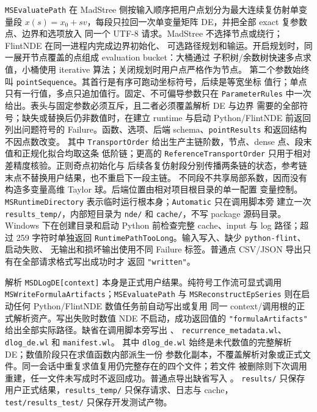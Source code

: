 \documentclass[11pt,a4paper]{ctexart}
\begin{document}
\texttt{MSEvaluatePath} 在 MadStree 侧按输入顺序把用户点划分为最大连续复仿射单变量段
$x(s)=x_0+s v$，每段只拉回一次单变量矩阵 DE，并把全部 exact 复参数点、边界和选项放入
同一个 UTF-8 请求。MadStree 不选择节点或绕行；FlintNDE 在同一进程内完成边界初始化、
可选路径规划和输运。开启规划时，同一展开节点覆盖的点组成 evaluation bucket：大桶通过
子积树/余数树快速多点求值，小桶使用 iterative 算法；关闭规划时用户点严格作为节点。
第二个参数始终叫 \texttt{pointSequence}。其首行是有序可跑动坐标符号，后续是等宽坐标
值行；单点只有一行值，多点只追加值行。固定、不可偏导参数只在
\texttt{ParameterRules} 中一次给出。表头与固定参数必须互斥，且二者必须覆盖解析 DE 与边界
需要的全部符号；缺失或替换后仍非数值时，在建立 runtime 与启动 Python/FlintNDE 前返回
列出问题符号的 Failure。函数、选项、后端 schema、\texttt{pointResults} 和返回结构不因点数改变。
其中 \texttt{TransportOrder} 给出生产主链阶数，节点、dense 点、段末值和正规化拟合均取这条
低阶链；更高的 \texttt{ReferenceTransportOrder} 只用于相对差精度核验。正则奇点初始化与
后续各复仿射段分别传播两条链的状态，参考链末点不替换用户结果，也不重启下一段主链。
不同段不共享局部系数，因而没有构造多变量高维 Taylor 球。后端位置由相对项目根目录的单一配置
变量控制。\texttt{MSRuntimeDirectory} 表示临时运行根本身；\texttt{Automatic} 只在调用脚本旁
建立一次 \texttt{results\_temp/}，内部短目录为 \texttt{nde/} 和 \texttt{cache/}，不写 package
源码目录。Windows 下在创建目录和启动 Python 前检查完整 cache、input 与 log 路径；超过 259
字符时单独返回 \texttt{RuntimePathTooLong}。输入写入、缺少 \texttt{python-flint}、启动失败、
无输出和损坏输出使用不同 Failure 标签。普通点 CSV/JSON 导出只有在全部请求格式写出成功时才
返回 \texttt{"written"}。

解析 \texttt{MSDLogDE[context]} 本身是正式用户结果。纯符号工作流可显式调用
\texttt{MSWriteFormula\allowbreak Artifacts}；\texttt{MSEvaluatePath} 与
\texttt{MSReconstructEp\allowbreak Series} 则在启动任何 Python/FlintNDE 数值任务前自动写出或复用
同一 context/调用根的正式解析资产。写出失败时数值 NDE 不启动，成功返回值的
\texttt{"formula\allowbreak Artifacts"} 给出全部实际路径。缺省在调用脚本旁写出
、
\texttt{recurrence\_metadata.wl}、\texttt{dlog\_de.wl} 和 \texttt{manifest.wl}。
其中 \texttt{dlog\_de.wl} 始终是未代数值的完整解析 DE；数值阶段只在求值函数内部派生一份
参数化副本，不覆盖解析对象或正式文件。同一会话中重复求值复用仍完整存在的四个文件；若文件
被删除则下次调用重建，任一文件未写成时不返回成功。普通点导出缺省写入
。
\texttt{results/} 只保存用户正式结果，\texttt{results\_temp/} 只保存请求、日志与 cache，
\texttt{test/results\_test/} 只保存开发测试产物。
\end{document}

